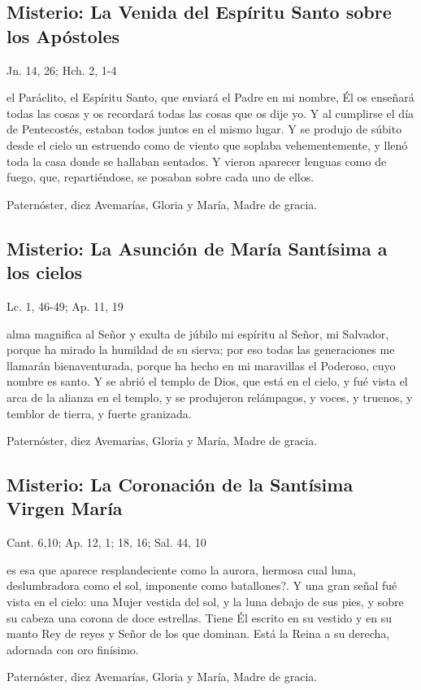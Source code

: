 \documentclass[./main.tex]{subfiles}
\newcounter{glorious-counter}
\begin{document}
\subsection*{ Misterio: La Venida del Espíritu Santo sobre los Apóstoles}
\begin{flushright}
      {\color{red}Jn. 14, 26; Hch. 2, 1-4}
\end{flushright}
 el Paráclito, el Espíritu Santo, que enviará el Padre en mi nombre, Él os enseñará todas las cosas y os recordará todas las cosas que os dije yo. 
Y al cumplirse el día de Pentecostés, estaban todos juntos en el mismo lugar. Y se produjo de súbito desde el cielo un estruendo como de viento que soplaba vehementemente, 
y llenó toda la casa donde se hallaban sentados. Y vieron aparecer lenguas como de fuego, que, repartiéndose, se posaban sobre cada uno de ellos.

\begin{center}
      Paternóster, diez Avemarías, Gloria y María, Madre de gracia.
\end{center}

\subsection*{ Misterio: La Asunción de María Santísima a los cielos}
\begin{flushright}
      {\color{red}Lc. 1, 46-49; Ap. 11, 19}
\end{flushright}
 alma magnifica al Señor y exulta de júbilo mi espíritu al Señor, mi Salvador, porque ha mirado la humildad de su sierva; 
por eso todas las generaciones me llamarán bienaventurada, porque ha hecho en mi maravillas el Poderoso, cuyo nombre es santo. Y se abrió el templo de Dios, que está en el cielo, 
y fué vista el arca de la alianza en el templo, y se produjeron relámpagos, y voces, y truenos, y temblor de tierra, y fuerte granizada.

\begin{center}
      Paternóster, diez Avemarías, Gloria y María, Madre de gracia.
\end{center}

\subsection*{ Misterio: La Coronación de la Santísima Virgen María}
\begin{flushright}
      {\color{red}Cant. 6,10; Ap. 12, 1; 18, 16; Sal. 44, 10}
\end{flushright}
 es esa que aparece resplandeciente como la aurora, hermosa cual luna, deslumbradora como el sol, imponente como batallones?. 
Y una gran señal fué vista en el cielo: una Mujer vestida del sol, y la luna debajo de sus  pies, y sobre su cabeza una corona de doce estrellas. 
Tiene Él escrito en su vestido y en su manto Rey de reyes y Señor de los que dominan. Está la Reina a su derecha, adornada con oro finísimo.

\begin{center}
      Paternóster, diez Avemarías, Gloria y María, Madre de gracia.
\end{center}
\end{document}
